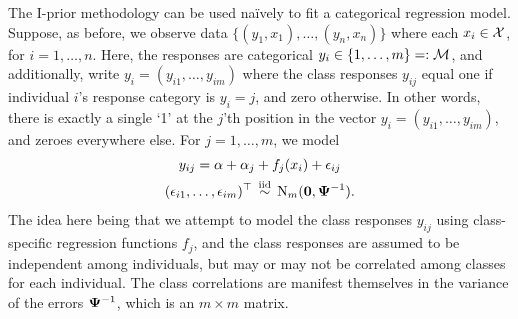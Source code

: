 The I-prior methodology can be used naïvely to fit a categorical regression model.
Suppose, as before, we observe data $\{(y_1,x_1),\dots,(y_n,x_n) \}$ where each $x_i \in {\mathcal X}$, for $i=1,\dots,n$.
Here, the responses are categorical $y_i \in \{ 1,\dots,m \} =: 
{\mathcal M} $, and additionally, write $y_i = (y_{i1},\dots,y_{im}) $ where the class responses $y_{ij}$ equal one if individual $i$'s response category is $y_i = j$, and zero otherwise.
In other words, there is exactly a single `1' at the $j$'th position in the vector $y_i = (y_{i1},\dots,y_{im})$, and zeroes everywhere else.
For $j=1,\dots,m$, we model 
\begin{equation}\label{eq:naiveclassmod}
  \begin{gathered}
    y_{ij} = \alpha + \alpha_j + f_j(x_i) + \epsilon_{ij}  \\
    (\epsilon_{i1},\dots,\epsilon_{im})^\top \,\overset{\text{iid}}{\sim}\, \operatorname{N}_m({\mathbf 0},{\bm\Psi}^{-1}).
  \end{gathered}
\end{equation}
The idea here being that we attempt to model the class responses $y_{ij}$ using class-specific regression functions $f_j$, and the class responses are assumed to be independent among individuals, but may or may not be correlated among classes for each individual.
The class correlations are manifest themselves in the variance of the errors ${\bm\Psi}^{-1}$, which is an $m\times m$ matrix.

